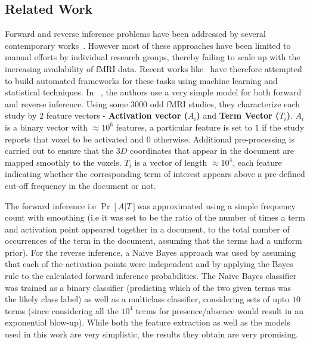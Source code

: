 \documentclass[11pt]{article}
\begin{document}
\subsection{Related Work}
Forward and reverse inference problems have been addressed by several contemporary works~\cite{schwartz2013mapping, PMSKBY12, sanmi2013multi, yarkoni2011large}.
However most of these approaches have been limited to manual efforts by individual research groups, thereby failing to scale up with the increasing availability of fMRI data. Recent works like~\cite{yarkoni2011large, sanmi2013multi} have therefore attempted to build automated frameworks for these tasks using machine learning and statistical techniques.  In ~\cite{yarkoni2011large}, the authors use a very simple model for both forward and reverse inference. Using some $3000$ odd fMRI studies, they characterize each study by $2$ feature vectors - \textbf{Activation vector ($A_i$)} and \textbf{Term Vector ($T_i$)}.  $A_i$ is a binary vector with $\approx 10^6$ features, a particular feature is set to $1$ if the study reports that voxel to be activated and $0$ otherwise. Additional pre-processing is carried out to ensure that the $3D$ coordinates that appear in the document are mapped smoothly to the voxels. $T_i$  is a vector of length $\approx 10^4$, each feature indicating whether the corresponding term of interest appears above a pre-defined cut-off frequency in the document or not. 

The forward inference i.e $\Pr[A \vert T] $was approximated using a simple frequency count with smoothing (i.e it was set to be the ratio of the number of times a term and activation point appeared together in a document, to the total  number of occurrences of the term in the document, assuming that the terms had a uniform prior). For the reverse inference,  a Naive Bayes approach was used by assuming that each of the activation points were independent and by applying the Bayes rule to the calculated forward inference probabilities. The Naive Bayes classifier was trained as a binary classifier (predicting which of the two given terms was the likely class label) as well as a multiclass classifier, considering sets of upto $10$ terms (since considering all the $10^4$ terms for presence/absence would result in an exponential blow-up). While both the feature extraction as well as the models used in this work are very simplistic, the results they obtain are very promising. 
\end{document}
